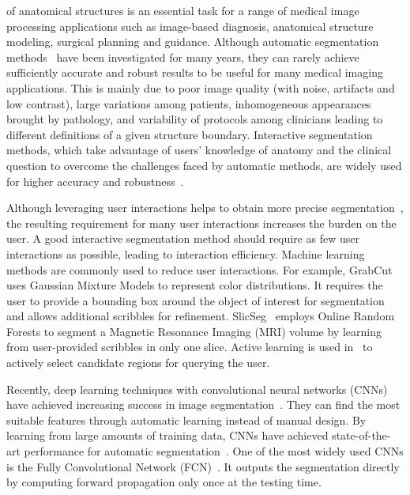 \documentclass[10pt,journal,compsoc]{IEEEtran}
\begin{document}
 of anatomical structures is an essential task for a range of medical image processing applications such as image-based diagnosis, anatomical structure modeling, surgical planning and guidance. %
Although automatic segmentation methods~\cite{Sharma2010} have been investigated for many years, they can rarely achieve sufficiently accurate and robust results to be useful for many medical imaging applications. This is mainly due to poor image quality (with noise, artifacts and low contrast), large variations among patients, inhomogeneous appearances brought by pathology, and variability of protocols among clinicians leading to different definitions of a given structure boundary. Interactive segmentation methods, which take advantage of users' knowledge of anatomy and the clinical question to overcome the challenges faced by automatic methods, are widely used for higher accuracy and robustness~\cite{Zhao2013}. 


Although leveraging user interactions helps to obtain more precise segmentation~\cite{Boykov2001, Xu1998,Grady2006a, Criminisi2008}, the resulting requirement for many user interactions increases the burden on the user. A good interactive segmentation method should require as few user interactions as possible, leading to interaction efficiency. Machine learning methods are commonly used to reduce user interactions. For example, GrabCut~\cite{Rother2004} uses Gaussian Mixture Models to represent color distributions. It requires the user to provide a bounding box around the object of interest for segmentation and allows additional scribbles for refinement. SlicSeg~\cite{Wang2016} employs Online Random Forests to segment a Magnetic Resonance Imaging (MRI) volume by learning from user-provided scribbles in only one slice. Active
learning is used in~\cite{Wang2014a} to actively select candidate regions for querying the user.


Recently, deep learning techniques with convolutional neural networks (CNNs) have achieved increasing success in image segmentation~\cite{Girshick2014, Long2014, Chen2015iclr}. %
They can find the most suitable features through automatic learning instead of manual design. %
By learning from large amounts of training data, CNNs have achieved state-of-the-art performance for automatic segmentation~\cite{Chen2015iclr,Havaei2016, Kamnitsas2017}. One of the most widely used CNNs is the Fully Convolutional Network (FCN)~\cite{Long2014}. It outputs the segmentation directly by computing forward propagation only once at the testing time.
\end{document}
